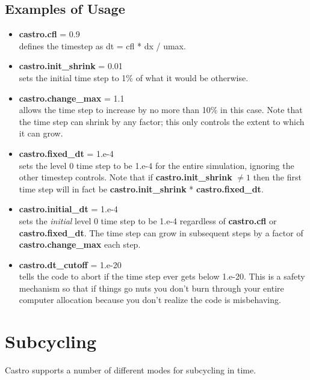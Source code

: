 \subsection{Examples of Usage}

\begin{itemize}

\item {\bf castro.cfl} = 0.9 \\
defines the timestep as dt = cfl * dx / umax.

\item {\bf castro.init\_shrink} = 0.01 \\
sets the initial time step to 1\% of what it would be otherwise.  

\item {\bf castro.change\_max} = 1.1\\
allows the time step to increase by no more than 10\% in this case.    Note that the time step
can shrink by any factor; this only controls the extent to which it can grow.

\item {\bf castro.fixed\_dt} = 1.e-4\\
sets the level 0 time step to be 1.e-4 for the entire simulation, 
ignoring the other timestep controls.   Note that if {\bf castro.init\_shrink} $\neq 1$
then the first time step will in fact be {\bf castro.init\_shrink} * {\bf castro.fixed\_dt}.

\item {\bf castro.initial\_dt} = 1.e-4\\
sets the {\it initial} level 0 time step to be 1.e-4 regardless of 
{\bf castro.cfl} or {\bf castro.fixed\_dt}.  The time step can
grow in subsequent steps by a factor of {\bf castro.change\_max} each step.

\item {\bf castro.dt\_cutoff} = 1.e-20\\
tells the code to abort if the time step ever gets below 1.e-20. 
This is a safety mechanism so that if things go nuts you don't burn through your 
entire computer allocation because you don't realize the code is misbehaving.

\end{itemize}

\section{Subcycling}
Castro supports a number of different modes for subcycling in time.

